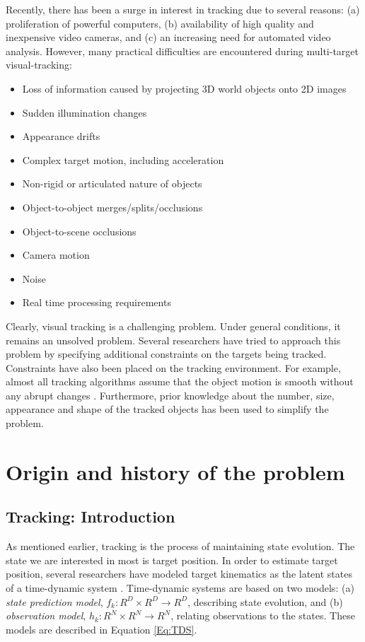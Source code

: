 \documentclass[12pt,letterpaper,doublespaced,ETD,proposal]{gt-ece-thesis}
\begin{document}
\begin{Body}
Recently, there has been a surge in interest in tracking due to several reasons: (a) proliferation of powerful computers, (b) availability of high quality and inexpensive video cameras, and (c) an increasing need for automated video analysis.  However, many practical difficulties are encountered during multi-target visual-tracking:

\begin{itemize}
\item Loss of information caused by projecting 3D world objects onto 2D images
\item Sudden illumination changes
\item Appearance drifts
\item Complex target motion, including acceleration
\item Non-rigid or articulated nature of objects
\item Object-to-object merges/splits/occlusions
\item Object-to-scene occlusions
\item Camera motion
\item Noise
\item Real time processing requirements
\end{itemize} 

Clearly, visual tracking is a challenging problem.  Under general conditions, it remains an unsolved problem.  Several researchers have tried to approach this problem by specifying additional constraints on the targets being tracked.  Constraints have also been placed on the tracking environment.  For example, almost all tracking algorithms assume that the object motion is smooth without any abrupt changes \cite{2006_JNL_SURVEYtrk_Yilmaz}.  Furthermore, prior knowledge about the number, size, appearance and shape of the tracked objects has been used to simplify the problem.  


\newpage
\section{Origin and history of the problem}
\label{Sec:Origin}
\subsection{Tracking: Introduction}
As mentioned earlier, tracking is the process of maintaining state evolution.  The state we are interested in most is target position.  In order to estimate target position, several researchers have modeled target kinematics as the latent states of a time-dynamic system \cite{2002_JNL_PF_Arulampalam}.  Time-dynamic systems are based on two models: (a) \emph{state prediction model}, $f_k:R^D \times R^D \rightarrow R^D$, describing state evolution, and (b) \emph{observation model}, $h_k:R^N \times R^N \rightarrow R^N$, relating observations to the states.  These models are described in Equation \ref{Eq:TDS}.


\end{Body}
\end{document}
